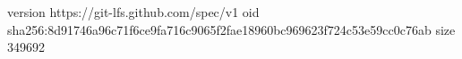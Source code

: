version https://git-lfs.github.com/spec/v1
oid sha256:8d91746a96c71f6ce9fa716c9065f2fae18960bc969623f724c53e59cc0c76ab
size 349692
